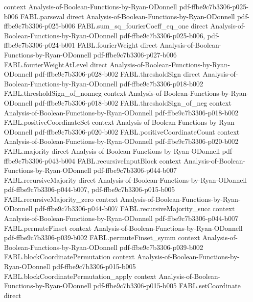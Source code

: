 \begin{theorem}
  {context}
  {Analysis-of-Boolean-Functions-by-Ryan-ODonnell}
  {pdf-ffbe9c7b3306-p025-b006}
\proofstep
  {FABL.parseval}
  {direct}
  {Analysis-of-Boolean-Functions-by-Ryan-ODonnell}
  {pdf-ffbe9c7b3306-p025-b006}
\proofstep
  {FABL.sum_sq_fourierCoeff_eq_one}
  {direct}
  {Analysis-of-Boolean-Functions-by-Ryan-ODonnell}
  {pdf-ffbe9c7b3306-p025-b006,
    pdf-ffbe9c7b3306-p024-b001}
\proofstep
  {FABL.fourierWeight}
  {direct}
  {Analysis-of-Boolean-Functions-by-Ryan-ODonnell}
  {pdf-ffbe9c7b3306-p027-b006}
\proofstep
  {FABL.fourierWeightAtLevel}
  {direct}
  {Analysis-of-Boolean-Functions-by-Ryan-ODonnell}
  {pdf-ffbe9c7b3306-p028-b002}
\proofstep
  {FABL.thresholdSign}
  {direct}
  {Analysis-of-Boolean-Functions-by-Ryan-ODonnell}
  {pdf-ffbe9c7b3306-p018-b002}
\proofstep
  {FABL.thresholdSign_of_nonneg}
  {context}
  {Analysis-of-Boolean-Functions-by-Ryan-ODonnell}
  {pdf-ffbe9c7b3306-p018-b002}
\proofstep
  {FABL.thresholdSign_of_neg}
  {context}
  {Analysis-of-Boolean-Functions-by-Ryan-ODonnell}
  {pdf-ffbe9c7b3306-p018-b002}
\proofstep
  {FABL.positiveCoordinateSet}
  {context}
  {Analysis-of-Boolean-Functions-by-Ryan-ODonnell}
  {pdf-ffbe9c7b3306-p020-b002}
\proofstep
  {FABL.positiveCoordinateCount}
  {context}
  {Analysis-of-Boolean-Functions-by-Ryan-ODonnell}
  {pdf-ffbe9c7b3306-p020-b002}
\proofstep
  {FABL.majority}
  {direct}
  {Analysis-of-Boolean-Functions-by-Ryan-ODonnell}
  {pdf-ffbe9c7b3306-p043-b004}
\proofstep
  {FABL.recursiveInputBlock}
  {context}
  {Analysis-of-Boolean-Functions-by-Ryan-ODonnell}
  {pdf-ffbe9c7b3306-p044-b007}
\proofstep
  {FABL.recursiveMajority}
  {direct}
  {Analysis-of-Boolean-Functions-by-Ryan-ODonnell}
  {pdf-ffbe9c7b3306-p044-b007,
    pdf-ffbe9c7b3306-p015-b005}
\proofstep
  {FABL.recursiveMajority_zero}
  {context}
  {Analysis-of-Boolean-Functions-by-Ryan-ODonnell}
  {pdf-ffbe9c7b3306-p044-b007}
\proofstep
  {FABL.recursiveMajority_succ}
  {context}
  {Analysis-of-Boolean-Functions-by-Ryan-ODonnell}
  {pdf-ffbe9c7b3306-p044-b007}
\proofstep
  {FABL.permuteFinset}
  {context}
  {Analysis-of-Boolean-Functions-by-Ryan-ODonnell}
  {pdf-ffbe9c7b3306-p039-b002}
\proofstep
  {FABL.permuteFinset_symm}
  {context}
  {Analysis-of-Boolean-Functions-by-Ryan-ODonnell}
  {pdf-ffbe9c7b3306-p039-b002}
\proofstep
  {FABL.blockCoordinatePermutation}
  {context}
  {Analysis-of-Boolean-Functions-by-Ryan-ODonnell}
  {pdf-ffbe9c7b3306-p015-b005}
\proofstep
  {FABL.blockCoordinatePermutation_apply}
  {context}
  {Analysis-of-Boolean-Functions-by-Ryan-ODonnell}
  {pdf-ffbe9c7b3306-p015-b005}
\proofstep
  {FABL.setCoordinate}
  {direct}

\end{theorem}
